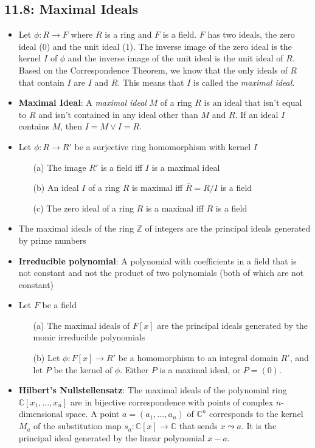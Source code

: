 \documentclass[12pt]{article}
\begin{document}
\subsection*{11.8: Maximal Ideals}
\begin{itemize}
  \item Let $\phi: R \to F$ where $R$ is a ring and $F$ is a field. $F$ has two ideals, the zero ideal (0) and the unit ideal (1). The inverse image of the zero ideal is the kernel $I$ of $\phi$ and the inverse image of the unit ideal is the unit ideal of $R$. Based on the Correspondence Theorem, we know that the only ideals of $R$ that contain $I$ are $I$ and $R$. This means that $I$ is called the \textit{maximal ideal}.
  \item \textbf{Maximal Ideal}: A \textit{maximal ideal} $M$ of a ring $R$ is an ideal that isn't equal to $R$ and isn't contained in any ideal other than $M$ and $R$. If an ideal $I$ contains $M$, then $I = M \lor I = R$.
  \item Let $\phi: R \to R'$ be a surjective ring homomorphism with kernel $I$
  \begin{enumerate}
    \item[(a)] The image $R'$ is a field iff $I$ is a maximal ideal
    \item[(b)] An ideal $I$ of a ring $R$ is maximal iff $\bar{R} = R/I$ is a field
    \item[(c)] The zero ideal of a ring $R$ is a maximal iff $R$ is a field
  \end{enumerate}
  \item The maximal ideals of the ring $\mathbb{Z}$ of integers are the principal ideals generated by prime numbers
  \item \textbf{Irreducible polynomial}: A polynomial with coefficients in a field that is not constant and not the product of two polynomials (both of which are not constant)
  \item Let $F$ be a field
  \begin{enumerate}
    \item[(a)] The maximal ideals of $F[x]$ are the principal ideals generated by the monic irreducible polynomials
    \item[(b)] Let $\phi: F[x] \to R'$ be a homomorphism to an integral domain $R'$, and let $P$ be the kernel of $\phi$. Either $P$ is a maximal ideal, or $P = (0)$.
  \end{enumerate}
  \item \textbf{Hilbert's Nullstellensatz}: The maximal ideals of the polynomial ring $\mathbb{C}[x_1, ..., x_n]$ are in bijective correspondence with points of complex $n$-dimensional space. A point $a = (a_1,...,a_n)$ of $\mathbb{C}^n$ corresponds to the kernel $M_a$ of the substitution map $s_a: \mathbb{C}[x] \to \mathbb{C}$ that sends $x \leadsto a$. It is the principal ideal generated by the linear polynomial $x - a$.

\end{itemize}
\end{document}
